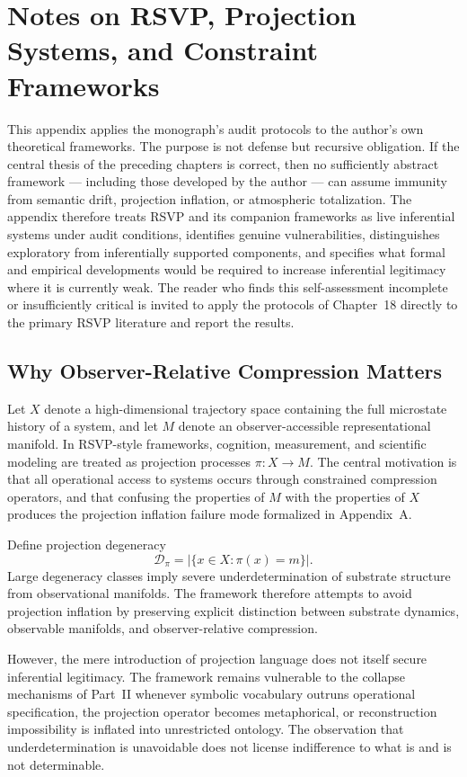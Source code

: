 \documentclass[12pt, openright, twoside]{book}
\begin{document}
\chapter{Notes on RSVP, Projection Systems, and Constraint Frameworks}

This appendix applies the monograph's audit protocols to the author's
own theoretical frameworks. The purpose is not defense but recursive
obligation. If the central thesis of the preceding chapters is correct,
then no sufficiently abstract framework --- including those developed
by the author --- can assume immunity from semantic drift, projection
inflation, or atmospheric totalization. The appendix therefore treats
RSVP and its companion frameworks as live inferential systems under
audit conditions, identifies genuine vulnerabilities, distinguishes
exploratory from inferentially supported components, and specifies what
formal and empirical developments would be required to increase inferential
legitimacy where it is currently weak. The reader who finds this
self-assessment incomplete or insufficiently critical is invited to
apply the protocols of Chapter~18 directly to the primary RSVP
literature and report the results.

\section{Why Observer-Relative Compression Matters}

Let $X$ denote a high-dimensional trajectory space containing the full
microstate history of a system, and let $M$ denote an observer-accessible
representational manifold. In RSVP-style frameworks, cognition, measurement,
and scientific modeling are treated as projection processes
$\pi : X \to M$. The central motivation is that all operational access
to systems occurs through constrained compression operators, and that
confusing the properties of $M$ with the properties of $X$ produces
the projection inflation failure mode formalized in Appendix~A.

Define projection degeneracy
\[
\mathcal{D}_\pi
= |\{x \in X : \pi(x) = m\}|.
\]
Large degeneracy classes imply severe underdetermination of substrate
structure from observational manifolds. The framework therefore attempts
to avoid projection inflation by preserving explicit distinction between
substrate dynamics, observable manifolds, and observer-relative compression.

However, the mere introduction of projection language does not itself
secure inferential legitimacy. The framework remains vulnerable to the
collapse mechanisms of Part~II whenever symbolic vocabulary outruns
operational specification, the projection operator becomes metaphorical,
or reconstruction impossibility is inflated into unrestricted ontology.
The observation that underdetermination is unavoidable does not license
indifference to what is and is not determinable.
\end{document}
